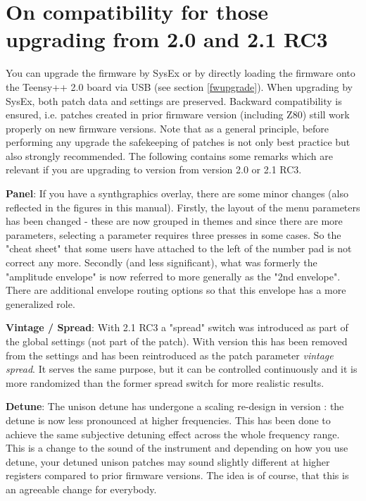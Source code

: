 \documentclass[landscape, 11pt, oneside, twoside]{report}
\newenvironment{flowtext}{\addmargin[0cm]{0cm}}{\endaddmargin} %
\begin{document}
\begin{flowtext}
\section{On compatibility for those upgrading from 2.0 and 2.1 RC3}

You can upgrade the firmware by SysEx or by directly loading the firmware onto the Teensy++ 2.0 board via USB (see section \ref{fwupgrade}). When upgrading by SysEx, both patch data and settings are preserved. Backward compatibility is ensured, i.e. patches created in prior firmware version (including Z80) still work properly on new firmware versions. Note that as a general principle, before performing any upgrade the safekeeping of patches is not only best practice but also strongly recommended. The following contains some remarks which are relevant if you are upgrading to version \version from version 2.0 or 2.1 RC3.

\textbf{Panel}: If you have a synthgraphics overlay, there are some minor changes (also reflected in the figures in this manual). Firstly, the layout of the menu parameters has been changed - these are now grouped in themes and since there are more parameters, selecting a parameter requires three presses in some cases. So the "cheat sheet" that some users have attached to the left of the number pad is not correct any more. Secondly (and less significant), what was formerly the "amplitude envelope" is now referred to more generally as the "2nd envelope". There are additional envelope routing options so that this envelope has a more generalized role. 

\textbf{Vintage / Spread}: With 2.1 RC3 a "spread" switch was introduced as part of the global settings (not part of the patch). With version \version this has been removed from the settings and has been reintroduced as the patch parameter \textit{vintage spread}. It serves the same purpose, but it can be controlled continuously and it is more randomized than the former spread switch for more realistic results.

\textbf{Detune}: The unison detune has undergone a scaling re-design in version \version: the detune is now less pronounced at higher frequencies. This has been done to achieve the same subjective detuning effect across the whole frequency range. This is a change to the sound of the instrument and depending on how you use detune, your detuned unison patches may sound slightly different at higher registers compared to prior firmware versions. The idea is of course, that this is an agreeable change for everybody.


\end{flowtext}
\end{document}
